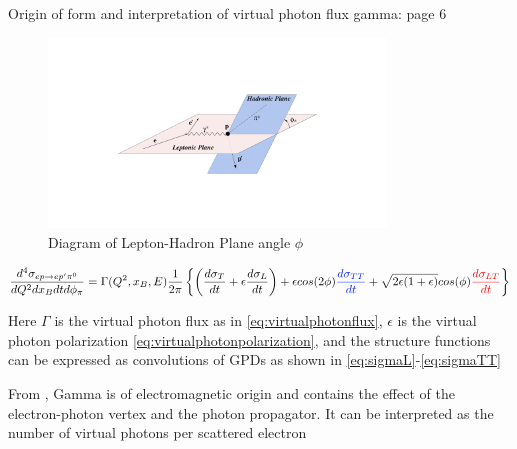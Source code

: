             
            Origin of form and interpretation of virtual photon flux gamma: \parencite{Amaldi1979Pion-electroproduction} page 6
    
                \begin{figure}[H]
            \centering
            \includegraphics[width=0.8\textwidth]{Chapters/Ch1-Intro/Ch1-Sec2-GPDs-DVMP/pics/lept_had_planes.png}
            \caption{Diagram of Lepton-Hadron Plane angle $\phi$}
            \label{fig:phi_trento}
                \end{figure}
    
        
            
             \begin{equation}\labelAndRemember{eq:DVPiPCrossSection_theory}
                   {\frac{d^4\sigma_{ep \rightarrow ep'\pi^0}}{dQ^2dx_Bdtd\phi_{\pi}} =
                 \Gamma (Q^2, x_B, E)
                 \frac{1}{2\pi}
                 \left\{ \left(  \textcolor{sigmaT}{\frac{d\sigma_T}{dt}}+\epsilon  \textcolor{sigmaL}{\frac{d\sigma_L}{dt}} \right)+
                 \epsilon cos(2\phi)  \textcolor{sigmaTT}{\frac{d\sigma_{TT}}{dt}} + 
                 \sqrt{2\epsilon(1+\epsilon)} cos(\phi)  \textcolor{sigmaLT}{\frac{d\sigma_{LT}}{dt}} \right\}}
             \end{equation}      
        
        
             Here $\Gamma$ is the virtual photon flux as in \eqref{eq:virtualphotonflux}, $\epsilon$ is the virtual photon polarization \eqref{eq:virtualphotonpolarization}, and the structure functions can be expressed as convolutions of GPDs as shown in \eqref{eq:sigmaL}-\eqref{eq:sigmaTT}
        
    
    
            From \parencite{Amaldi1979Pion-electroproduction}, Gamma is of electromagnetic origin and contains the effect of the electron-photon vertex and the photon propagator. It can be interpreted as the number of virtual photons per scattered electron 
    
